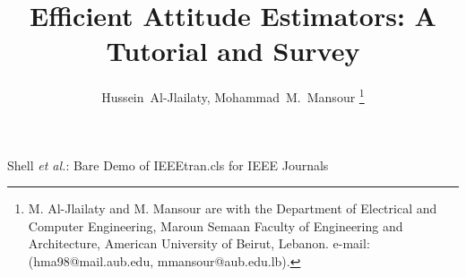 \documentclass[journal]{IEEEtran}
\begin{document}
%
\title{Efficient Attitude Estimators: A 
Tutorial and Survey}
%
%
%

\author{Hussein~Al-Jlailaty, Mohammad~M.~Mansour%
\thanks{M. Al-Jlailaty and M. Mansour are with the Department
of Electrical and Computer Engineering, Maroun Semaan Faculty of Engineering   and   Architecture, American University of Beirut, Lebanon.
 e-mail: (hma98@mail.aub.edu, mmansour@aub.edu.lb).}%
}%


% 
%



%
{Shell \MakeLowercase{\textit{et al.}}: Bare Demo of IEEEtran.cls for IEEE Journals}
% 
\end{document}

